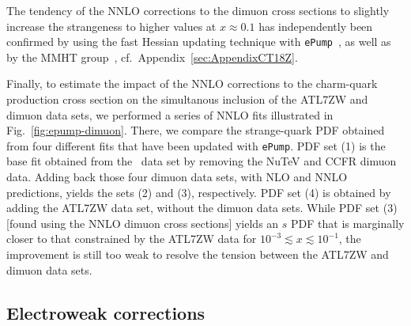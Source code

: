 The tendency of the NNLO corrections to the dimuon cross sections to slightly increase the strangeness to higher values at $x\! \approx\! 0.1$ has  independently been confirmed by using the fast Hessian updating technique with \texttt{ePump}~\cite{Hou:2019gfw}, as well as by the MMHT group~\cite{Thorne:2019mpt}, cf.~Appendix~\ref{sec:AppendixCT18Z}.

Finally, to estimate the impact of the NNLO corrections to the charm-quark production cross section on the simultanous inclusion of the ATL7ZW and dimuon data sets,
we performed a series of NNLO fits illustrated in Fig.~\ref{fig:epump-dimuon}. There, we compare the strange-quark PDF obtained 
from four different fits that have been updated with \texttt{ePump}. PDF set (1)
is the base fit obtained from the \CTHERAII~data set by removing
the NuTeV and CCFR dimuon data. 
Adding back those four dimuon data sets, with NLO and NNLO predictions, yields the sets (2) and (3), respectively. PDF set (4) is obtained 
by adding the ATL7ZW data set, without the dimuon data sets. 
While PDF set (3) [found using the NNLO dimuon cross sections] yields an $s$ PDF that is marginally closer to
that constrained by the  ATL7ZW data for $10^{-3}\! \lesssim\! x\! \lesssim\! 10^{-1}$,  the improvement is still too weak to resolve the tension between the 
ATL7ZW and dimuon data sets.


\subsection{Electroweak corrections}
\label{sec:EW}
%
%


